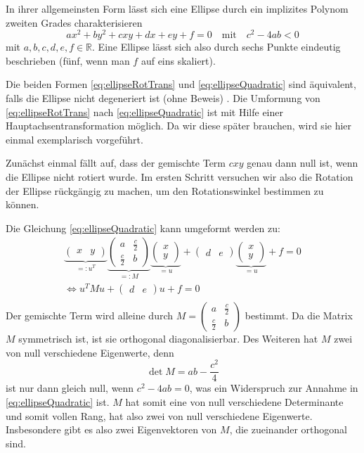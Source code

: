 In ihrer allgemeinsten Form lässt sich eine Ellipse durch ein implizites Polynom zweiten Grades charakterisieren
\begin{equation} \label{eq:ellipseQuadratic}
ax^2 + by^2 + cxy + dx + ey + f = 0 \quad \text{mit}\quad c^2-4ab < 0
\end{equation} 
mit $a,b,c,d,e,f \in \mathbb{R}$. Eine Ellipse lässt sich also durch sechs Punkte eindeutig beschrieben (fünf, wenn man $f$ auf eins skaliert).


Die beiden Formen \ref{eq:ellipseRotTrans} und \ref{eq:ellipseQuadratic} sind äquivalent, falls die Ellipse nicht degeneriert ist (ohne Beweis) \cite{Lawrence1972}. Die Umformung von \ref{eq:ellipseRotTrans} nach \ref{eq:ellipseQuadratic} ist mit Hilfe einer Hauptachsentransformation möglich. 
Da wir diese später brauchen, wird sie hier einmal exemplarisch vorgeführt. 

Zunächst einmal fällt auf, dass der gemischte Term $cxy$ genau dann null ist, wenn die Ellipse nicht rotiert wurde. Im ersten Schritt versuchen wir also die Rotation der Ellipse rückgängig zu machen, um den Rotationswinkel bestimmen zu können.

Die Gleichung \ref{eq:ellipseQuadratic} kann umgeformt werden zu:
\begin{equation*}
\begin{aligned}
\underbrace{\begin{pmatrix}x & y\end{pmatrix}}_{=:u^T}\underbrace{\begin{pmatrix}a & \frac{c}{2} \\ \frac{c}{2} & b\end{pmatrix}}_{=: M}\underbrace{\begin{pmatrix}x \\ y\end{pmatrix}}_{=u} +\begin{pmatrix}d & e\end{pmatrix}\underbrace{\begin{pmatrix}x \\ y\end{pmatrix}}_{=u}+ f = 0 \\
\Leftrightarrow u^TMu +\begin{pmatrix}d & e\end{pmatrix}u + f = 0 \\
\end{aligned}
\end{equation*} 
Der gemischte Term wird alleine durch $M = \begin{pmatrix}a & \frac{c}{2} \\ \frac{c}{2} & b\end{pmatrix}$ bestimmt. Da die Matrix $M$ symmetrisch ist, ist sie orthogonal diagonalisierbar. Des Weiteren hat $M$ zwei von null verschiedene Eigenwerte, denn 
\[
\det M = ab - \dfrac{c^2}{4}
\] ist nur dann gleich null, wenn $c^2 - 4ab = 0$, was ein Widerspruch zur Annahme in \ref{eq:ellipseQuadratic} ist. $M$ hat somit eine von null verschiedene Determinante und somit vollen Rang, hat also zwei von null verschiedene Eigenwerte. Insbesondere gibt es also zwei Eigenvektoren von $M$, die zueinander orthogonal sind.

